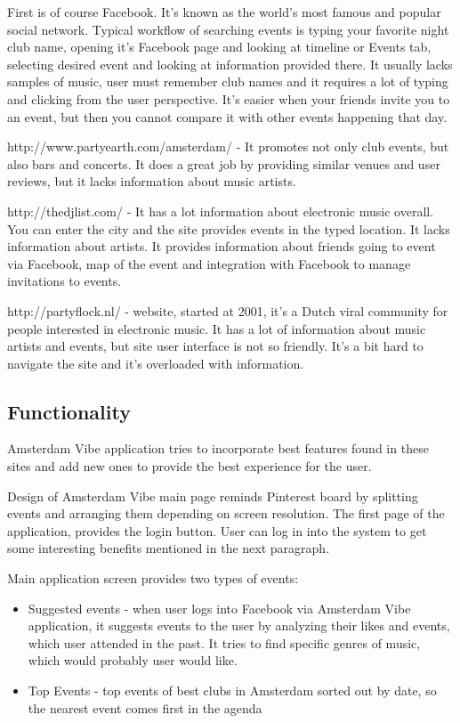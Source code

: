 \documentclass[12pt, a4paper, lithuanian]{article}
\begin{document}
  First is of course Facebook. It's known as the world's most famous and popular social network. Typical workflow of searching events is typing your favorite night club name, opening it's Facebook page and looking at timeline or Events tab, selecting desired event and looking at information provided there. It usually lacks samples of music, user must remember club names and it requires a lot of typing and clicking from the user perspective. It's easier when your friends invite you to an event, but then you cannot compare it with other events happening that day.

  http://www.partyearth.com/amsterdam/ - It promotes not only club events, but also bars and concerts. It does a great job by providing similar venues and user reviews, but it lacks information about music artists.

  http://thedjlist.com/ - It has a lot information about electronic music overall. You can enter the city and the site provides events in the typed location. It lacks information about artists. It provides information about friends going to event via Facebook, map of the event and integration with Facebook to manage invitations to events. 

  http://partyflock.nl/ - website, started at 2001, it's a Dutch viral community for people interested in electronic music. It has a lot of information about music artists and events, but site user interface is not so friendly. It's a bit hard to navigate the site and it's overloaded with information.

\subsection{Functionality}

  Amsterdam Vibe application tries to incorporate best features found in these sites and add new ones to provide the best experience for the user.

  Design of Amsterdam Vibe main page reminds Pinterest board by splitting events and arranging them depending on screen resolution. The first page of the application, provides the login button. User can log in into the system to get some interesting benefits mentioned in the next paragraph.

  Main application screen provides two types of events:

\begin{itemize}

  \item Suggested events - when user logs into Facebook via Amsterdam Vibe application, it suggests events to the user by analyzing their likes and events, which user attended in the past. It tries to find specific genres of music, which would probably user would like.

  \item Top Events - top events of best clubs in Amsterdam sorted out by date, so the nearest event comes first in the agenda

\end{itemize}
\end{document}
